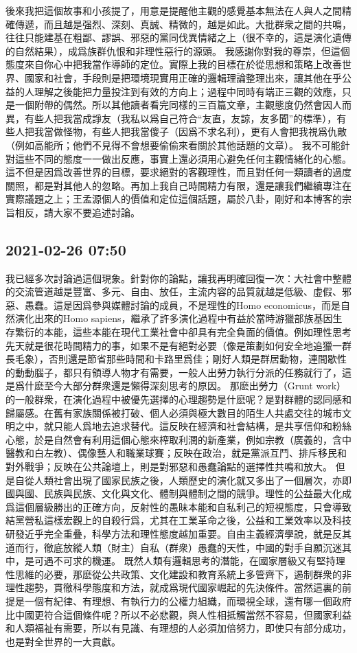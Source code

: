 \documentclass[twocolumn]{ctexart}
\begin{document}
後來我把這個故事和小孩提了，用意是提醒他主觀的感覺基本無法在人與人之間精確傳遞，而且越是强烈、深刻、真誠、精微的，越是如此。大批群衆之間的共鳴，往往只能建基在粗鄙、謬誤、邪惡的黨同伐異情緒之上（很不幸的，這是演化遺傳的自然結果），成爲族群仇恨和非理性惡行的源頭。
我感謝你對我的尊崇，但這個態度來自你心中把我當作導師的定位。實際上我的目標在於從思想和策略上改善世界、國家和社會，手段則是把環境現實用正確的邏輯理論整理出來，讓其他在乎公益的人理解之後能把力量投注到有效的方向上；過程中同時有端正三觀的效應，只是一個附帶的偶然。所以其他讀者看完同樣的三百篇文章，主觀態度仍然會因人而異，有些人把我當成諍友（我私以爲自己符合“友直，友諒，友多聞”的標準），有些人把我當做怪物，有些人把我當傻子（因爲不求名利），更有人會把我視爲仇敵（例如高能所；他們不見得不會想要偷偷來看關於其他話題的文章）。
我不可能針對這些不同的態度一一做出反應，事實上還必須用心避免任何主觀情緒化的心態。這不但是因爲改善世界的目標，要求絕對的客觀理性，而且對任何一類讀者的過度關照，都是對其他人的忽略。再加上我自己時間精力有限，還是讓我們繼續專注在實際議題之上；王孟源個人的價值和定位這個話題，屬於八卦，剛好和本博客的宗旨相反，請大家不要追述討論。
\subsection*{2021-02-26 07:50}

我已經多次討論過這個現象。針對你的論點，讓我再明確回復一次：大社會中整體的交流管道越是豐富、多元、自由、放任，主流内容的品質就越是低級、虛假、邪惡、愚蠢。這是因爲參與媒體討論的成員，不是理性的Homo economicus，而是自然演化出來的Homo sapiens，繼承了許多演化過程中有益於當時游獵部族基因生存繁衍的本能，這些本能在現代工業社會中卻具有完全負面的價值。例如理性思考先天就是很花時間精力的事，如果不是有絕對必要（像是策劃如何安全地追獵一群長毛象），否則還是節省那些時間和卡路里爲佳；剛好人類是群居動物，連間歇性的動動腦子，都只有領導人物才有需要，一般人出勞力執行分派的任務就行了，這是爲什麽至今大部分群衆還是懶得深刻思考的原因。
那麽出勞力（Grunt work）的一般群衆，在演化過程中被優先選擇的心理趨勢是什麽呢？是對群體的認同感和歸屬感。在舊有家族關係被打破、個人必須與極大數目的陌生人共處交往的城市文明之中，就只能人爲地去追求替代。這反映在經濟和社會結構，是共享信仰和粉絲心態，於是自然會有利用這個心態來榨取利潤的新產業，例如宗教（廣義的，含中醫教和白左教）、偶像藝人和職業球賽；反映在政治，就是黨派互鬥、排斥移民和對外戰爭；反映在公共論壇上，則是對邪惡和愚蠢論點的選擇性共鳴和放大。
但是自從人類社會出現了國家民族之後，人類歷史的演化就又多出了一個層次，亦即國與國、民族與民族、文化與文化、體制與體制之間的競爭。理性的公益最大化成爲這個層級勝出的正確方向，反射性的愚昧本能和自私利己的短視態度，只會導致結黨營私這樣宏觀上的自殺行爲，尤其在工業革命之後，公益和工業效率以及科技研發近乎完全重叠，科學方法和理性態度越加重要。自由主義經濟學說，就是反其道而行，徹底放縱人類（財主）自私（群衆）愚蠢的天性，中國的對手自願沉迷其中，是可遇不可求的機運。
既然人類有邏輯思考的潛能，在國家層級又有堅持理性思維的必要，那麽從公共政策、文化建設和教育系統上多管齊下，遏制群衆的非理性趨勢，貫徹科學態度和方法，就成爲現代國家崛起的先決條件。當然這裏的前提是一個有紀律、有理想、有執行力的公權力組織，而環視全球，還有哪一個政府比中國更符合這個條件呢？所以不必悲觀，與人性相抵觸當然不容易，但國家利益和人類福祉有需要，所以有見識、有理想的人必須加倍努力，即使只有部分成功，也是對全世界的一大貢獻。
\end{document}

